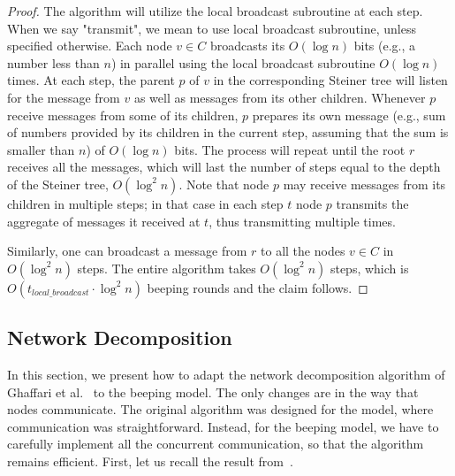 \begin{proof}
The algorithm will utilize the local broadcast subroutine at each step. When we say "transmit", we mean to use local broadcast subroutine, unless specified otherwise. Each node $v \in C$ broadcasts its $O(\log n)$ bits (e.g., a number less than $n$) in parallel using the local broadcast subroutine $O(\log n)$ times. At each step, the parent $p$ of $v$ in the corresponding Steiner tree will listen for the message from $v$ as well as messages from its other children. Whenever $p$ receive messages from some of its children, $p$ prepares its own message (e.g., sum of numbers provided by its children in the current step, assuming that the sum is smaller than $n$) of $O(\log n)$ bits. The process will repeat until the root $r$ receives all the messages, which will last the number of steps equal to the depth of the Steiner tree, $O(\log^2 n)$. Note that node $p$ may receive messages from its children in multiple steps; in that case in each step $t$ node $p$ transmits the aggregate of messages it received at $t$, thus transmitting multiple times.

Similarly, one can broadcast a message from $r$ to all the nodes $v\in C$ in $O(\log^2 n)$ steps. The entire algorithm takes $O(\log^2 n)$ steps, which is $O(t_{local\_broadcast} \cdot \log^2 n)$ beeping rounds and the claim follows.
\end{proof}


\subsection{Network Decomposition}
\label{sec:decomposition}




In this section, we present how to adapt the network decomposition algorithm of Ghaffari et al.~\cite{ghaffari2021improved} to the beeping model. The only changes are in the way that nodes communicate. The original algorithm was %
designed for the \congest model, where communication was straightforward. 
Instead, for the beeping model, we have to carefully implement all the concurrent communication, so that the algorithm remains efficient.
%
First, let us recall the result from~\cite{ghaffari2021improved}. 

